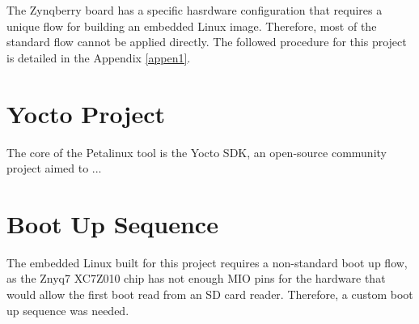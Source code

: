 The Zynqberry board has a specific hasrdware configuration that requires a unique flow for building an embedded Linux image. Therefore, most of the standard flow cannot be applied directly. The followed procedure for this project is detailed in the Appendix \ref{appen1}.

\section{Yocto Project}

The core of the Petalinux tool is the Yocto SDK, an open-source community project aimed to ... %

\section{Boot Up Sequence}

The embedded Linux built for this project requires a non-standard boot up flow, as the Znyq7 XC7Z010 chip has not enough MIO pins for the hardware that would allow the first boot read from an SD card reader. Therefore, a custom boot up sequence was needed.

